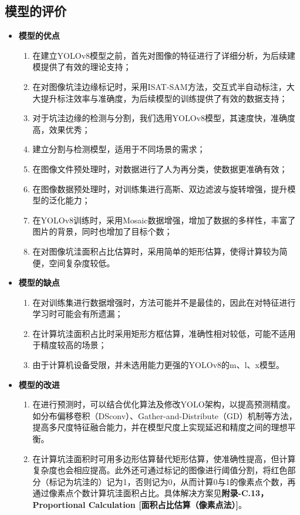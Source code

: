 \documentclass{MathorCupmodeling}
\begin{document}
	\subsection{模型的评价}
	\begin{itemize}
		\item \textbf{模型的优点}
		\begin{enumerate}
			\item 在建立YOLOv8模型之前，首先对图像的特征进行了详细分析，为后续建模提供了有效的理论支持；
			\item 在对图像坑洼边缘标记时，采用ISAT-SAM方法，交互式半自动标注，大大提升标注效率与准确度，为后续模型的训练提供了有效的数据支持；
			\item 对于坑洼边缘的检测与分割，我们选用YOLOv8模型，其速度快，准确度高，效果优秀；
			\item 建立分割与检测模型，适用于不同场景的需求；
			\item 在图像文件预处理时，对数据进行了人为再分类，使数据更准确有效；
			\item 在图像数据预处理时，对训练集进行高斯、双边滤波与旋转增强，提升模型的泛化能力；
			\item 在YOLOv8训练时，采用Mosaic数据增强，增加了数据的多样性，丰富了图片的背景，同时也增加了目标个数；
			\item 在对图像坑洼面积占比估算时，采用简单的矩形估算，使得计算较为简便，空间复杂度较低。
		\end{enumerate}
		\item \textbf{模型的缺点}
		\begin{enumerate}
			\item 在对训练集进行数据增强时，方法可能并不是最佳的，因此在对特征进行学习时可能会有所遗漏；
			\item 在计算坑洼面积占比时采用矩形方框估算，准确性相对较低，可能不适用于精度较高的场景；
			\item 由于计算机设备受限，并未选用能力更强的YOLOv8的m、l、x模型。
		\end{enumerate}
		\item \textbf{模型的改进}\label{改进}
		\begin{enumerate}
			\item 在进行预测时，可以结合优化算法及修改YOLO架构，以提高预测精度。如分布偏移卷积（DSconv）\textcolor{blue}{\cite{Dsconv}}、Gather-and-Distribute（GD）机制\textcolor{blue}{\cite{Gold-YOLO}}等方法，提高多尺度特征融合能力，并在模型尺度上实现延迟和精度之间的理想平衡。
			\item 在计算坑洼面积时可用多边形估算替代矩形估算，使准确性提高，但计算复杂度也会相应提高。此外还可通过标记的图像进行阈值分割，将红色部分（标记为坑洼的）记为1，否则记为0，从而计算0与1的像素点个数，再通过像素点个数计算坑洼面积占比\textcolor{blue}{\cite{改进}}。具体解决方案见\textbf{附录-C.13，Proportional Calculation [面积占比估算（像素点法）]}。
		\end{enumerate}

	\end{itemize}
\end{document}
